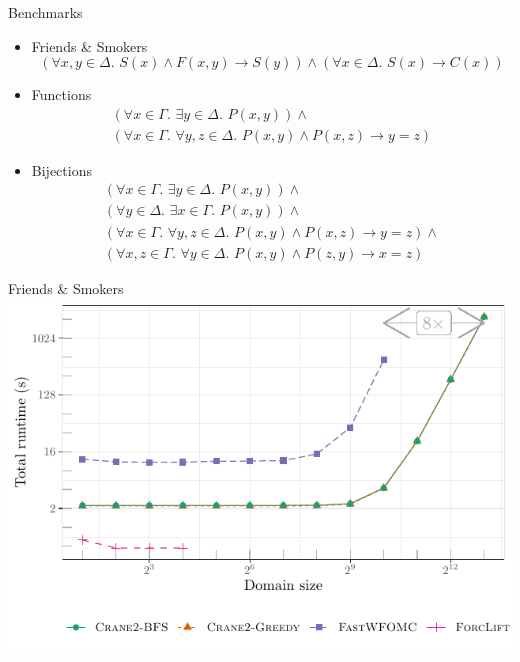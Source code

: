 \documentclass{beamer}
\begin{document}
\begin{frame}{Benchmarks}
  \begin{itemize}
    \item Friends \& Smokers
          \[
          (\forall x,y \in \Delta\text{.
          } S(x) \land F(x, y) \to S(y)) \land (\forall x \in \Delta\text{.
          }S(x) \to C(x))
          \]
          \pause
    \item Functions
          \begin{gather*}
            (\forall x \in \Gamma\text{. }\exists y \in \Delta\text{. }P(x, y)) \land{}\\
            (\forall x \in \Gamma\text{. }\forall y, z \in \Delta\text{. }P(x, y) \land P(x, z) \to y = z)
          \end{gather*}
          \pause
    \item Bijections
          \begin{gather*}
            (\forall x \in \Gamma\text{. }\exists y \in \Delta\text{. }P(x, y))\land{}\\
            (\forall y \in \Delta\text{. }\exists x \in \Gamma\text{. }P(x, y))\land{}\\
            (\forall x \in \Gamma\text{. }\forall y, z \in \Delta\text{. }P(x, y) \land P(x, z) \to y = z)\land{}\\
            (\forall x, z \in \Gamma\text{. }\forall y \in \Delta\text{. }P(x, y) \land P(z, y) \to x = z)
          \end{gather*}
  \end{itemize}
\end{frame}

\begin{frame}{Friends \& Smokers}
  \centering
  \includegraphics{friends.pdf}
\end{frame}
\end{document}

